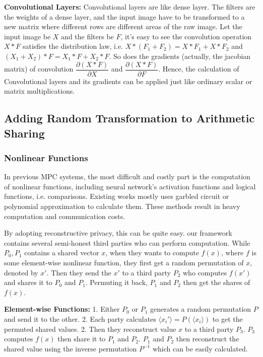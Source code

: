 \textbf{Convolutional Layers: }
Convolutional layers are like dense layer. The filters are the weights of a dense layer, and the input image have to be transformed to a new matrix where different rows are different areas of the raw image. Let the input image be $X$ and the filters be $F$, it's easy to see the convolution operation $X*F$ satisfies the distribution law, i.e. $X*(F_1 + F_2) = X*F_1 + X*F_2$ and $(X_1 + X_2) * F = X_1*F + X_2*F$. So does the gradients (actually, the jacobian matrix) of convolution $\dfrac{\partial (X*F)}{\partial X}$ and $\dfrac{\partial (X*F)}{\partial F}$. Hence, the calculation of Convolutional layers and its gradients can be applied just like ordinary scalar or matrix multiplications.

\subsection{Adding Random Transformation to Arithmetic Sharing}
\subsubsection{Nonlinear Functions}
In previous MPC systems, the most difficult and costly part is the computation of nonlinear functions, including neural network's activation functions and logical functions, i.e. comparisons. Existing works mostly uses garbled circuit or polynomial approximation to calculate them. These methods result in heavy computation and communication costs.

By adopting reconstructive privacy, this can be quite easy. our framework contains several semi-honest third parties who can perform computation. While $P_0, P_1$ contains a shared vector $x$, when they wants to compute $f(x)$, where $f$ is some element-wise nonlinear function, they first get a random permutation of $x$, denoted by $x'$. Then they send the $x'$ to a third party $P_2$ who computes $f(x')$ and shares it to $P_0$ and $P_1$. Permuting it back, $P_1$ and $P_2$ then get the shares of $f(x)$. 

\textbf{Element-wise Functions: }
1. Either $P_0$ or $P_1$ generates a random permutation $P$ and send it to the other.
2. Each party calculates $\langle x_i'\rangle = P(\langle x_i\rangle)$ to get the permuted shared values.
2. Then they reconstruct value $x$ to a third party $P_3$. $P_3$ computes $f(x)$ then share it to $P_1$ and $P_2$. $P_1$ and $P_2$ then reconstruct the shared value using the inverse permutation $P^{-1}$ which can be easily calculated.
